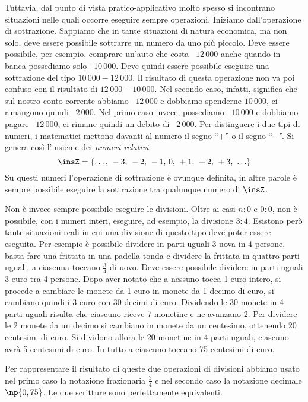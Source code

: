 Tuttavia, dal punto di vista pratico-applicativo molto spesso si incontrano situazioni nelle quali occorre eseguire sempre operazioni. Iniziamo dall'operazione di sottrazione. Sappiamo che in tante situazioni di natura economica, ma non solo, deve essere possibile sottrarre un numero da uno più piccolo. Deve essere possibile, per esempio, comprare un'auto che costa \officialeuro~$12\,000$ anche quando in banca possediamo solo \officialeuro~$10\,000$. Deve quindi essere possibile eseguire una sottrazione del tipo $10\,000-12\,000$. Il risultato di questa operazione non va poi confuso con il risultato di $12\,000-10\,000$. Nel secondo caso, infatti, significa che sul nostro conto corrente abbiamo \officialeuro~$12\,000$ e dobbiamo spenderne $10\,000$, ci rimangono quindi \officialeuro~$2\,000$. Nel primo caso invece, possediamo \officialeuro~$10\,000$ e dobbiamo pagare
\officialeuro~$12\,000$, ci rimane quindi un debito di \officialeuro~$2\,000$. Per distinguere i due tipi di numeri, i matematici mettono davanti al numero il segno ``$+$'' o il segno ``$-$''. Si genera così l'insieme dei \emph{numeri relativi}.
\[\insZ=\{\ldots\text{, }-3\text{, }-2\text{, }-1\text{, }0\text{, }+1\text{, }+2\text{, }+3\text{, }\ldots\}\]
Su questi numeri l'operazione di sottrazione è ovunque definita, in altre parole è sempre possibile eseguire la sottrazione tra qualunque numero di $\insZ$.

Non è invece sempre possibile eseguire le divisioni. Oltre ai casi $n:0$ e $0:0$, non è possibile, con i numeri interi, eseguire, ad esempio, la divisione $3:4$. Esistono però tante situazioni reali in cui una divisione di questo tipo deve poter essere eseguita. Per esempio è possibile dividere in parti uguali 3 uova in 4 persone, basta fare una frittata in una padella tonda e dividere la frittata in quattro parti uguali, a ciascuna toccano $\frac{3}{4}$ di uovo. Deve
essere possibile dividere in parti uguali 3 euro tra 4 persone. Dopo aver notato che a nessuno tocca 1 euro intero, si procede a cambiare le monete da 1 euro in monete da 1 decimo di euro, si cambiano quindi i 3 euro con 30 decimi di euro. Dividendo le 30 monete in 4 parti uguali risulta che ciascuno riceve 7 monetine e ne avanzano 2. Per dividere le 2 monete da un decimo si cambiano in monete da un centesimo, ottenendo 20 centesimi di euro. Si dividono allora le 20 monetine in 4 parti uguali, ciascuno avrà 5 centesimi di euro. In tutto a ciascuno toccano 75 centesimi di euro.

Per rappresentare il risultato di queste due operazioni di divisioni abbiamo usato nel primo caso la notazione frazionaria $\frac{3}{4}$ e nel secondo caso la notazione decimale $\np{0,75}$. Le due scritture sono perfettamente equivalenti.

